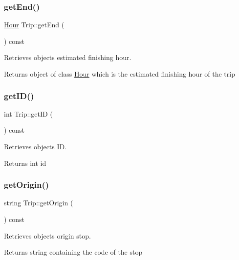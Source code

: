 \subsubsection{\texorpdfstring{get\+End()}{getEnd()}}
{\footnotesize\ttfamily \hyperlink{class_hour}{Hour} Trip\+::get\+End (\begin{DoxyParamCaption}{ }\end{DoxyParamCaption}) const}



Retrieves object\textquotesingle{}s estimated finishing hour. 

\begin{DoxyReturn}{Returns}
object of class \hyperlink{class_hour}{Hour} which is the estimated finishing hour of the trip 
\end{DoxyReturn}
\mbox{\label{group___trip_ga61fea247b075bfac3f6115da4bd56ef5}} 
\subsubsection{\texorpdfstring{get\+I\+D()}{getID()}}
{\footnotesize\ttfamily int Trip\+::get\+ID (\begin{DoxyParamCaption}{ }\end{DoxyParamCaption}) const}



Retrieves object\textquotesingle{}s ID. 

\begin{DoxyReturn}{Returns}
int id 
\end{DoxyReturn}
\mbox{\label{group___trip_gaf63e96a9b31ad6def658944bc6a9f327}} 
\subsubsection{\texorpdfstring{get\+Origin()}{getOrigin()}}
{\footnotesize\ttfamily string Trip\+::get\+Origin (\begin{DoxyParamCaption}{ }\end{DoxyParamCaption}) const}



Retrieves object\textquotesingle{}s origin stop. 

\begin{DoxyReturn}{Returns}
string containing the code of the stop 
\end{DoxyReturn}
\mbox{\label{group___trip_ga447efbf91bd4842daadac85d2bac4b9e}} 
